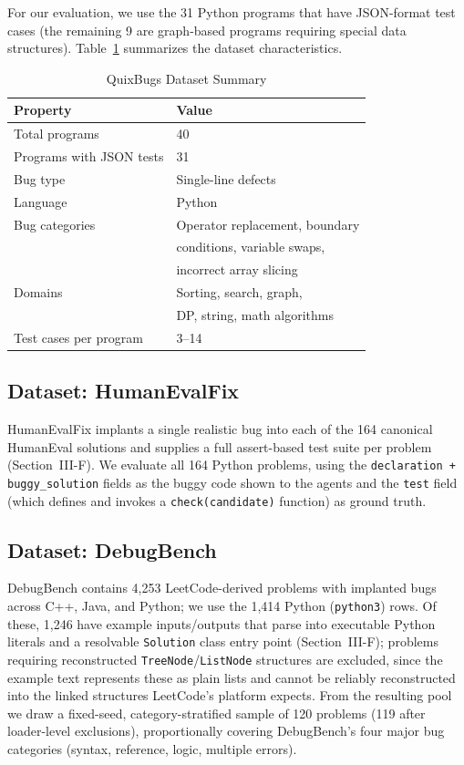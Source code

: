 \documentclass[conference]{IEEEtran}
\begin{document}
For our evaluation, we use the 31 Python programs that have JSON-format test cases (the remaining 9 are graph-based programs requiring special data structures). Table~\ref{tab:dataset} summarizes the dataset characteristics.

\begin{table}[htbp]
\caption{QuixBugs Dataset Summary}
\label{tab:dataset}
\centering
\begin{tabular}{ll}
\toprule
\textbf{Property} & \textbf{Value} \\
\midrule
Total programs & 40 \\
Programs with JSON tests & 31 \\
Bug type & Single-line defects \\
Language & Python \\
Bug categories & Operator replacement, boundary\\
 & conditions, variable swaps,\\
 & incorrect array slicing \\
Domains & Sorting, search, graph,\\
 & DP, string, math algorithms \\
Test cases per program & 3--14 \\
\bottomrule
\end{tabular}
\end{table}

\subsection{Dataset: HumanEvalFix}
HumanEvalFix \cite{humanevalpack} implants a single realistic bug into each of the 164 canonical HumanEval \cite{codex} solutions and supplies a full assert-based test suite per problem (Section~III-F). We evaluate all 164 Python problems, using the \texttt{declaration + buggy\_solution} fields as the buggy code shown to the agents and the \texttt{test} field (which defines and invokes a \texttt{check(candidate)} function) as ground truth.

\subsection{Dataset: DebugBench}
DebugBench \cite{debugbench} contains 4{,}253 LeetCode-derived problems with implanted bugs across C++, Java, and Python; we use the 1{,}414 Python (\texttt{python3}) rows. Of these, 1{,}246 have example inputs/outputs that parse into executable Python literals and a resolvable \texttt{Solution} class entry point (Section~III-F); problems requiring reconstructed \texttt{TreeNode}/\texttt{ListNode} structures are excluded, since the example text represents these as plain lists and cannot be reliably reconstructed into the linked structures LeetCode's platform expects. From the resulting pool we draw a fixed-seed, category-stratified sample of 120 problems (119 after loader-level exclusions), proportionally covering DebugBench's four major bug categories (syntax, reference, logic, multiple errors).
\end{document}
